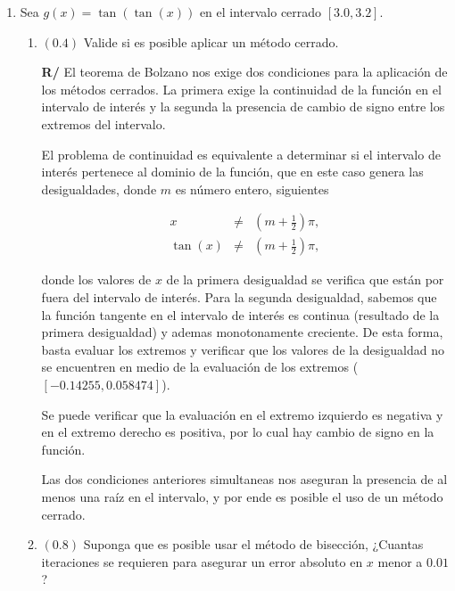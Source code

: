 \documentclass[12pt]{article}
\begin{document}
\begin{enumerate}[leftmargin=*,widest=9]
\begin{enumerate}[label=\alph*]
   \end{enumerate}
   
   \item Sea \(g(x) = \tan(\tan(x)) \) en el intervalo cerrado \( [3.0, 3.2] \).
   \begin{enumerate}[label=\alph*]
   
   \item \((0.4)\) Valide si es posible aplicar un método cerrado.
   
   
\textbf{R/} El teorema de Bolzano nos exige dos condiciones para la aplicación de los métodos cerrados. La primera exige la continuidad de la función en el intervalo de interés y la segunda la presencia de cambio de signo entre los extremos del intervalo.
   
El problema de continuidad es equivalente a determinar si el intervalo de interés pertenece al dominio de la función, que en este caso genera las desigualdades, donde \(m\) es número entero, siguientes

\begin{eqnarray*}
x & \neq & \left(m + \frac{1}{2} \right) \pi, \\
\tan(x) & \neq & \left(m + \frac{1}{2} \right) \pi,
\end{eqnarray*}

donde los valores de \(x\) de la primera desigualdad se verifica que están por fuera del intervalo de interés. Para la segunda desigualdad, sabemos que la función tangente en el intervalo de interés es continua (resultado de la primera desigualdad) y ademas monotonamente creciente. De esta forma, basta evaluar los extremos y verificar que los valores de la desigualdad no se encuentren en medio de la evaluación de los extremos (\([-0.14255, 0.058474]\)).

Se puede verificar que la evaluación en el extremo izquierdo es negativa y en el extremo derecho es positiva, por lo cual hay cambio de signo en la función.

Las dos condiciones anteriores simultaneas nos aseguran la presencia de al menos una raíz en el intervalo, y por ende es posible el uso de un método cerrado.
   
   \item \((0.8)\) Suponga que es posible usar el método de bisección, ¿Cuantas iteraciones se requieren para asegurar un error absoluto en \(x\) menor a \(0.01\) ?
   
   

\end{enumerate}
\end{enumerate}
\end{document}
